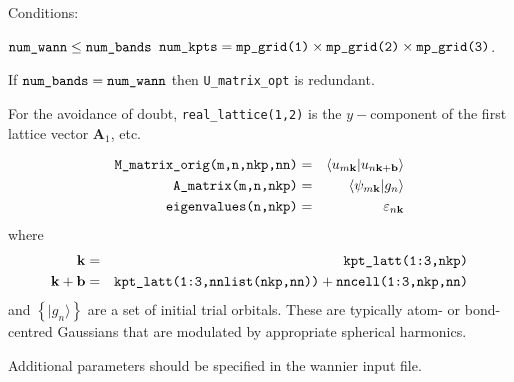 Conditions:
\begin{itemize}
\cond $\verb#num_wann# \le \verb#num_bands#$
\cond $\verb#num_kpts# = \verb#mp_grid(1)# \times \verb#mp_grid(2)#
\times \verb#mp_grid(3)#$.
\end{itemize}

If $\verb#num_bands# = \verb#num_wann#$ then \verb#U_matrix_opt# is
redundant. 

For the avoidance of doubt, \verb#real_lattice(1,2)# is the
$y-$component of the first lattice 
vector $\mathbf{A}_{1}$, etc.

\begin{eqnarray*}
\verb#M_matrix_orig(m,n,nkp,nn)# & = & \left\langle u_{m\mathbf{k}} |
u_{n\mathbf{k+b}}\right\rangle\\
\verb#A_matrix(m,n,nkp)# & = &
\left\langle \psi_{m\mathbf{k}}|g_{n}\right\rangle\\
\verb#eigenvalues(n,nkp)# &=& \varepsilon_{n\mathbf{k}}
\end{eqnarray*}
where
\begin{eqnarray*}
\mathbf{k} &=&\verb#kpt_latt(1:3,nkp)#\\
\mathbf{k+b}&=& \verb#kpt_latt(1:3,nnlist(nkp,nn))# +
\verb#nncell(1:3,nkp,nn)# 
\end{eqnarray*}
and
$\left\{|g_{n}\rangle\right\}$ are a set of initial trial
orbitals. These are
typically atom- or bond-centred Gaussians that are modulated by
appropriate spherical harmonics. 

Additional parameters should be specified in the wannier input
file.

